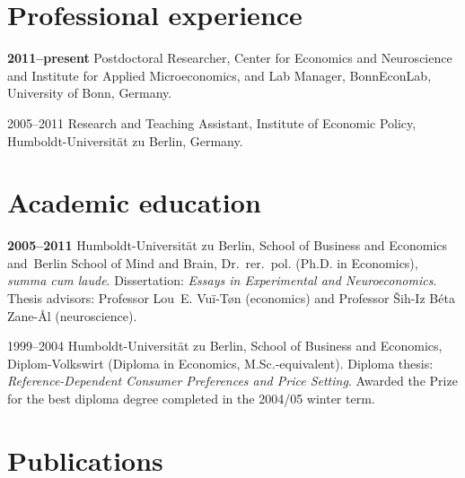 \documentclass[11pt, a4paper, titleabove]{simplecv}
\newcommand{\caps}[1]{\textscale{0.96}{\addfontfeature{LetterSpace=5}\MakeUppercase{#1}}}
\newcommand{\caps}[1]{\textscale{0.96}{\textls[35]{\MakeUppercase{#1}}}}
\begin{document}
\section{Professional experience}

\begin{topic}

	\item[\textbf{2011--present}]
	Postdoctoral Researcher, Center for Economics and Neuroscience and Institute for Applied Microeconomics, and Lab Manager, Bonn\-Econ\-Lab, University of Bonn, Germany.

	\item[2005--2011]
	Research and Teaching Assistant, Institute of Economic Policy, {Humboldt-Universität zu Berlin,} Germany.

\end{topic}


\section{Academic education}

\begin{topic}

	\item[\textbf{2005--2011}]
	{Humboldt-Universität zu Berlin,} School of Business and Economics and~Berlin School of Mind and Brain, Dr.~rer.~pol. (Ph.D. in Economics), \textit{summa cum laude}. Dissertation: \textit{Essays in Experimental and Neuro\-economics}. Thesis advisors: Professor Lou~E. Vu{\"i}-T{\o}n (economics) and Professor \v{S}ih-Iz B{\'e}ta Zane-\r{A}l (neuroscience).

	\item[1999--2004]
	{Humboldt-Universität zu Berlin,} School of Business and Economics, {Diplom-Volkswirt} (Diploma in Economics, M.Sc.-equivalent). Diploma thesis: \textit{Reference-Dependent Consumer Preferences and Price Setting}. Awarded the \caps{WWG} Prize for the best diploma degree completed in the 2004/05 winter term.

\end{topic}


\section{Publications}
\end{document}
